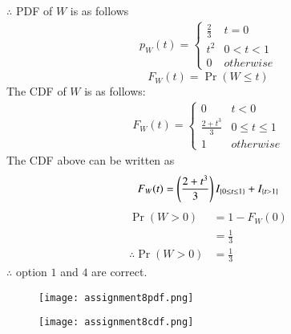 \documentclass[journal,12pt,twocolumn]{IEEEtran}
\begin{document}
$\therefore$ PDF of $W$ is as follows
\begin{align}
p_{W}(t)  = 
\begin{cases}
  \frac{2}{3}& t=0 \\
  t^2 & 0 < t < 1 \\
  0 & otherwise \label{10}
\end{cases}
\end{align}
\begin{equation}
F_W(t) = \Pr(W \leq t) \label{cdf}
\end{equation}
The CDF  of $W$ is as follows:
\begin{align}
F_W(t)  = 
\begin{cases}
  0 & t<0 \\
  \frac{2+t^3}{3}& 0 \leq t\leq 1\\
  1 & otherwise \label{10}
\end{cases}
\end{align}
The CDF above can be written as
\begin{align}
  F_W(t)=\left(\frac{2+t^3}{3}\right)I_{\{0\leq t \leq 1\}}+ I_{\{t > 1\}}
\end{align}
\begin{align}
\Pr(W > 0)&= 1- F_W(0) \\
           &=\frac{1}{3} \label{12} \\
\therefore \Pr(W>0)&=\frac{1}{3}
\end{align}
$\therefore$ option $1$ and $4$ are correct.
\begin{figure}[htb!]
\begin{center}
\texttt{[image: assignment8pdf.png]}
\end{center}
\end{figure}

\begin{figure}[htb!]
\begin{center}
\texttt{[image: assignment8cdf.png]}
\end{center}
\end{figure}
\end{document}
